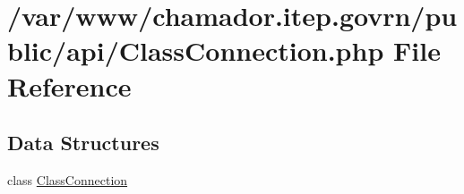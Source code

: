 \hypertarget{_class_connection_8php}{}\section{/var/www/chamador.itep.\+govrn/public/api/\+Class\+Connection.php File Reference}
\label{_class_connection_8php}
\subsection*{Data Structures}
\begin{DoxyCompactItemize}
\item 
class \hyperlink{class_class_connection}{Class\+Connection}
\end{DoxyCompactItemize}
